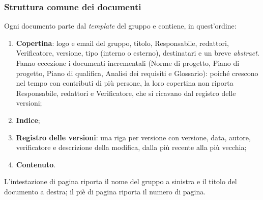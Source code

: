\documentclass[12pt,a4paper]{article}
\newcommand{\tightlist}{\setlength{\itemsep}{1pt}\setlength{\parskip}{0pt}}
\begin{document}
\subsubsection{Struttura comune dei documenti}
Ogni documento parte dal \emph{template} del gruppo e contiene, in quest'ordine:
\begin{enumerate}
\tightlist
\item \textbf{Copertina}: logo e email del gruppo, titolo, Responsabile, redattori, Verificatore, versione, tipo (interno o esterno), destinatari e un breve \emph{abstract}. Fanno eccezione i documenti incrementali (Norme di progetto, Piano di progetto, Piano di qualifica, Analisi dei requisiti e Glossario): poiché crescono nel tempo con contributi di più persone, la loro copertina non riporta Responsabile, redattori e Verificatore, che si ricavano dal registro delle versioni;
\item \textbf{Indice};
\item \textbf{Registro delle versioni}: una riga per versione con versione, data, autore, verificatore e descrizione della modifica, dalla più recente alla più vecchia;
\item \textbf{Contenuto}.
\end{enumerate}
L'intestazione di pagina riporta il nome del gruppo a sinistra e il titolo del documento a destra; il piè di pagina riporta il numero di pagina.
\end{document}
